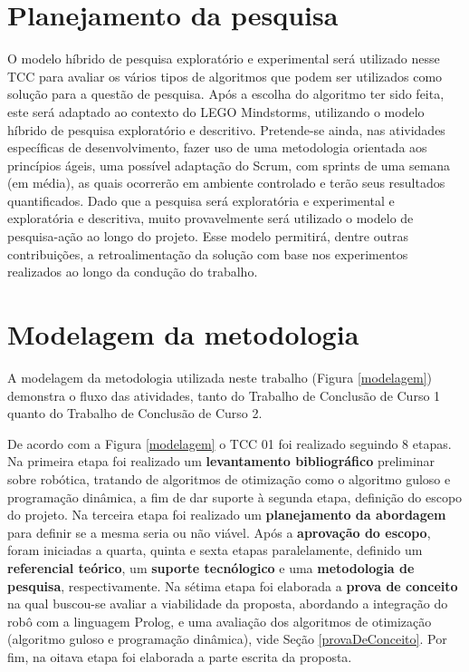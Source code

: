 \section{Planejamento da pesquisa}
	O modelo híbrido de pesquisa exploratório e experimental será utilizado nesse TCC para avaliar os vários tipos de algoritmos que podem ser utilizados como solução para a questão de pesquisa. Após a escolha do algoritmo ter sido feita, este será adaptado ao contexto do LEGO Mindstorms, utilizando o modelo híbrido de pesquisa exploratório e descritivo.
Pretende-se ainda, nas atividades específicas de desenvolvimento, fazer uso de uma  metodologia orientada aos princípios ágeis, uma possível adaptação do Scrum, com sprints
de uma semana (em média), as quais ocorrerão em ambiente controlado e terão seus resultados quantificados.
	Dado que a pesquisa será exploratória e experimental e exploratória e descritiva, muito provavelmente será utilizado o modelo de pesquisa-ação ao longo do projeto. Esse modelo permitirá, dentre outras contribuições, a retroalimentação da solução com base nos experimentos realizados ao longo da condução do trabalho.

\section{Modelagem da metodologia}
	A modelagem da metodologia utilizada neste trabalho (Figura \ref{modelagem}) demonstra o fluxo das atividades, tanto do Trabalho de Conclusão de Curso 1 quanto do Trabalho de Conclusão de Curso 2.

De acordo com a Figura \ref{modelagem} o TCC 01 foi realizado seguindo 8 etapas. Na primeira etapa foi realizado um \textbf{levantamento bibliográfico} preliminar sobre robótica, tratando de algoritmos de otimização como o algoritmo guloso e programação dinâmica, a fim de dar suporte à segunda etapa, definição do escopo do projeto. Na terceira etapa foi realizado um \textbf{planejamento da abordagem} para definir se a mesma seria ou não viável. Após a \textbf{aprovação do escopo}, foram iniciadas a quarta, quinta e sexta etapas paralelamente, definido um \textbf{referencial teórico}, um \textbf{suporte tecnólogico} e uma \textbf{metodologia de pesquisa}, respectivamente. Na sétima etapa foi elaborada a \textbf{prova de conceito} na qual buscou-se avaliar a viabilidade da proposta, abordando a integração do robô com a linguagem Prolog, e uma avaliação dos algoritmos de otimização (algoritmo guloso e programação dinâmica), vide Seção \ref{provaDeConceito}. Por fim, na oitava etapa foi elaborada a parte escrita da proposta. 

